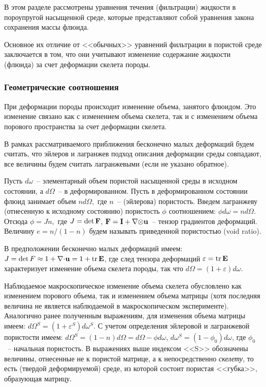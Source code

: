 В этом разделе рассмотрены уравнения течения (фильтрации) жидкости в пороупругой насыщенной среде,
которые представляют собой уравнения закона сохранения массы флюида.

Основное их отличие от <<обычных>> уравнений фильтрации в пористой среде заключается в том, 
что они учитывают изменение содержание жидкости (флюида) за счет деформации скелета породы.

\subsubsection{Геометрические соотношения}\label{sec:vol}

При деформации породы происходит изменение объема, занятого
флюидом. Это изменение связано как с изменением объема скелета, так и
с изменением объема порового пространства за счет деформации скелета.

В рамках рассматриваемого приближения бесконечно малых деформаций
будем считать, что эйлеров и лагранжев подход описания деформации
среды совпадают, все величины будем считать лагранжевыми (если не
указано обратное).


Пусть $d\omega$~-- элементарный объем пористой насыщенной среды в исходном состоянии, а $d\Omega$~-- в деформированном.
Пусть в деформированном состоянии флюид занимает объем 
%
\(
n d\Omega,
\)
%
где $n$~-- (эйлерова) пористость.  Введем лагранжеву (отнесенную к
исходному состоянию) пористость $\phi$ соотношением:
%
\(%
\phi d\omega = n d\Omega.
\)
%
Отсюда 
%
\(
\phi = J n,
\)
% 
где $J = \det \mathbf{F}$, 
$\mathbf{F} = \mathbf{I} + \nabla\mathbf{\otimes} \mathbf{u}$~-- тензор градиентов деформаций.
Величину 
%
\(
e = {n}/(1-n)
\)
%
будем называть приведенной пористостью (void ratio).

В предположении бесконечно малых деформаций имеем:
%
\(
J = \det F \approx 1 +  \nabla\mathbf{\cdot} \mathbf{u} =  1 + \operatorname{tr}\mathbf{E}
\), 
где след тензора деформаций $\varepsilon = \operatorname{tr}\mathbf{E}$
характеризует изменение объема скелета породы, так что
%
\(
d\Omega = (1 + \varepsilon) d\omega.
\)
%

Наблюдаемое макроскопическое изменение объема скелета обусловлено как изменением порового объема, так и 
изменением объема матрицы (хотя последняя величина не является наблюдаемой в макроскопическом эксперименте).
Аналогично ранее полученным выражениям, для изменения объема матрицы имеем:
%
\(
d\Omega^S = (1+\varepsilon^S) d\omega^S
\).
%
С учетом определения эйлеровой и лагранжевой пористости имеем:
%
$d\Omega^S = (1-n) d\Omega = d\Omega - \phi d\omega$,
$d\omega^S = (1-\phi_0) d\omega$,
%
где $\phi_0$~-- начальная пористость.
В выражениях выше индексом <<S>> обозначены величины, отнесенные не к 
пористой матрице, а к непосредственно \emph{скелету}, то есть (твердой
деформируемой) среде, из которой состоит пористая <<губка>>,
образующая матрицу.

